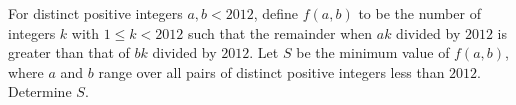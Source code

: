 For distinct positive integers $a, b<2012$, define $f(a, b)$ to be the number of integers $k$ with $1\le k<2012$ such that the remainder when $ak$ divided by $2012$ is greater than that of $bk$ divided by $2012$. Let $S$ be the minimum value of $f(a, b)$, where $a$ and $b$ range over all pairs of distinct positive integers less than $2012$. Determine $S$.